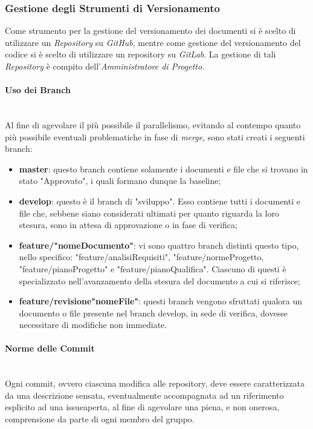 \subsubsection{Gestione degli Strumenti di Versionamento}\label{ProcessiOrganizzativi_Procedure_GestioneStrumentiVersionamento}
	Come strumento per la gestione del versionamento dei documenti si è scelto di utilizzare un \textit{Repository} su \textit{GitHub}, mentre come gestione del versionamento del codice si è scelto di utilizzare un repository su \textit{GitLab}. La gestione di tali \textit{Repository} è compito dell'\textit{Amministratore di Progetto}.

\paragraph{Uso dei Branch} ~\\
	Al fine di agevolare il più possibile il parallelismo, evitando al contempo quanto più possibile eventuali problematiche in fase di \textit{merge}\glossario, sono stati creati i seguenti branch\glossario:
	\begin{itemize}
	\item \textbf{master}: questo branch contiene solamente i documenti e file che si trovano in stato "Approvato", i quali formano dunque la baseline\glossario;
	\item \textbf{develop}: questo è il branch di "sviluppo". Esso contiene tutti i documenti e file che, sebbene siano considerati ultimati per quanto riguarda la loro stesura, sono in attesa di approvazione o in fase di verifica;
	\item \textbf{feature/"nomeDocumento"}: vi sono quattro branch distinti questo tipo, nello specifico: "feature/analisiRequisiti", "feature/normeProgetto, "feature/pianoProgetto" e "feature/pianoQualifica". Ciascuno di questi è specializzato nell'avanzamento della stesura del documento a cui si riferisce;
	\item \textbf{feature/revisione"nomeFile"}: questi branch vengono sfruttati qualora un documento o file presente nel branch develop, in sede di verifica, dovesse necessitare di modifiche non immediate.
	\end{itemize}

\paragraph{Norme delle Commit} ~\\
	Ogni commit\glossario, ovvero ciascuna modifica alle repository, deve essere caratterizzata da una descrizione sensata, eventualmente accompagnata ad un riferimento esplicito ad una issue\glossario aperta, al fine di agevolare una piena, e non onerosa, comprensione da parte di ogni membro del gruppo.

